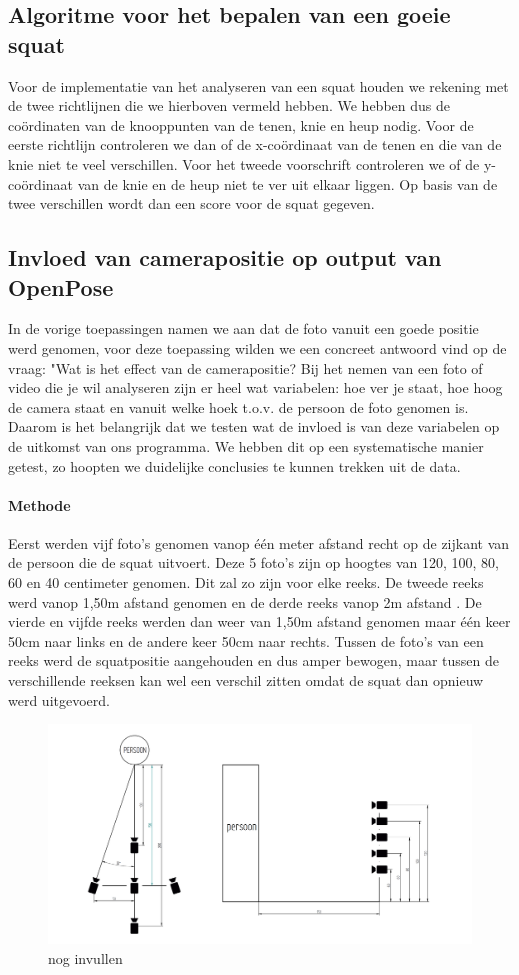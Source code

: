 \documentclass[a4paper,twoside,kulak]{kulakreport}
\begin{document}
\subsection{Algoritme voor het bepalen van een goeie squat}
Voor de implementatie van het analyseren van een squat houden we rekening met de twee richtlijnen die we hierboven vermeld hebben. We hebben dus de coördinaten van de knooppunten van de tenen, knie en heup nodig. Voor de eerste richtlijn controleren we dan of de x-coördinaat van de tenen en die van de knie niet te veel verschillen. Voor het tweede voorschrift controleren we of de y-coördinaat van de knie en de heup niet te ver uit elkaar liggen. Op basis van de twee verschillen wordt dan een score voor de squat gegeven.


\subsection{Invloed van camerapositie op output van OpenPose}
In de vorige toepassingen namen we aan dat de foto vanuit een goede positie werd genomen, voor deze toepassing wilden we een concreet antwoord vind op de vraag: "Wat is het effect van de camerapositie? Bij het nemen van een foto of video die je wil analyseren zijn er heel wat variabelen: hoe ver je staat, hoe hoog de camera staat en vanuit welke hoek t.o.v. de persoon de foto genomen is. Daarom is het belangrijk dat we testen wat de invloed is van deze variabelen op de uitkomst van ons programma. We hebben dit op een systematische manier getest, zo hoopten we duidelijke conclusies te kunnen trekken uit de data.
\label{camerapositie}
\paragraph{Methode}
Eerst werden vijf foto’s genomen vanop één meter afstand recht op de zijkant van de persoon die de squat uitvoert. Deze 5 foto’s zijn op hoogtes van 120, 100, 80, 60 en 40 centimeter genomen. Dit zal zo zijn voor elke reeks. De tweede reeks werd vanop 1,50m afstand genomen en de derde reeks vanop 2m afstand . De vierde en vijfde reeks werden dan weer van 1,50m afstand genomen maar één keer 50cm naar links en de andere keer 50cm naar rechts. Tussen de foto’s van een reeks werd de squatpositie aangehouden en dus amper bewogen, maar tussen de verschillende reeksen kan wel een verschil zitten omdat de squat dan opnieuw werd uitgevoerd.
\begin{figure}
	\includegraphics[width=\textwidth]{cameraopstelling}
	\caption{nog invullen}
\end{figure}
\end{document}
